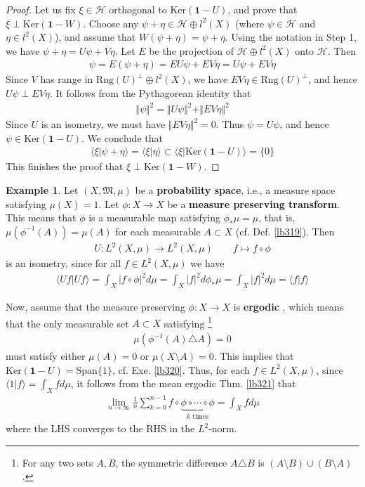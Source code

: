 \documentclass[12pt,b5paper,notitlepage]{article}
\theoremstyle{definition}
\newtheorem{eg}[df]{Example}
\theoremstyle{plain}
\newcommand{\fk}{\mathfrak}
\newcommand{\idt}{\mathbf{1}}
\newcommand{\Span}{\mathrm{Span}}
\newcommand{\bk}[1]{\langle {#1}\rangle}
\newcommand{\Ker}{\mathrm{Ker}}
\newcommand{\Rng}{\mathrm{Rng}}
\newcommand{\MH}{\mathcal H}
\newcommand{\hqed}{\hfill\qedsymbol}
\numberwithin{equation}{section}
\begin{document}
\begin{proof}
Let us fix $\xi\in\MH$ orthogonal to $\Ker(\idt-U)$, and prove that $\xi\perp\Ker(\idt-W)$. Choose any $\psi+\eta\in \MH\oplus l^2(X)$ (where $\psi\in\MH$ and $\eta\in l^2(X)$), and assume that $W(\psi+\eta)=\psi+\eta$. Using the notation in Step 1, we have $\psi+\eta=U\psi+V\eta$. Let $E$ be the projection of $\MH\oplus l^2(X)$ onto $\MH$. Then
\begin{align*}
\psi=E(\psi+\eta)=EU\psi+EV\eta=U\psi+EV\eta
\end{align*}
Since $V$ has range in $\Rng(U)^\perp\oplus l^2(X)$, we have $EV\eta\in\Rng(U)^\perp$, and hence $U\psi\perp EV\eta$. It follows from the Pythagorean identity that
\begin{align*}
\Vert\psi\Vert^2=\Vert U\psi\Vert^2+\Vert EV\eta\Vert^2
\end{align*}
Since $U$ is an isometry, we must have $\Vert EV\eta\Vert^2=0$. Thus $\psi=U\psi$, and hence $\psi\in\Ker(\idt-U)$. We conclude that
\begin{align*}
\bk{\xi|\psi+\eta}=\bk{\xi|\eta}\subset\bk{\xi|\Ker(\idt-U)}=\{0\}
\end{align*}
This finishes the proof that $\xi\perp\Ker(\idt-W)$.
\end{proof}




\begin{eg}
Let $(X,\fk M,\mu)$ be a \textbf{probability space},  i.e., a measure space satisfying $\mu(X)=1$. Let $\phi:X\rightarrow X$ be a \textbf{measure preserving transform}.  This means that $\phi$ is a measurable map satisfying $\phi_*\mu=\mu$, that is, $\mu(\phi^{-1}(A))=\mu(A)$ for each measurable $A\subset X$ (cf. Def. \ref{lb319}). Then
\begin{align}\label{eq170}
U:L^2(X,\mu)\rightarrow L^2(X,\mu)\qquad f\mapsto f\circ\phi
\end{align}
is an isometry, since for all $f\in L^2(X,\mu)$ we have
\begin{align*}
\bk{Uf|Uf}=\int_X |f\circ\phi|^2 d\mu=\int_X|f|^2d\phi_*\mu=\int_X|f|^2d\mu=\bk{f|f}
\end{align*}

Now, assume that the measure preserving $\phi:X\rightarrow X$ is \textbf{ergodic} , which means that the only measurable set $A\subset X$ satisfying \footnote{For any two sets $A,B$, the symmetric difference $A\triangle B$ is $(A\setminus B)\cup (B\setminus A)$.}
\begin{align*}
\mu(\phi^{-1}(A)\triangle A)=0
\end{align*}
must satisfy either $\mu(A)=0$ or $\mu(X\setminus A)=0$. This implies that $\Ker(\idt-U)=\Span\{1\}$, cf. Exe. \ref{lb320}. Thus, for each $f\in L^2(X,\mu)$, since $\bk{1|f}=\int_Xfd\mu$, it follows from the mean ergodic Thm. \ref{lb321} that
\begin{align*}
\lim_{n\rightarrow\infty}\frac {1}{n}\sum_{k=0}^{n-1}f\circ\underbrace{\phi\circ\cdots\circ\phi}_{k\text{ times}}=\int_Xfd\mu
\end{align*}
where the LHS converges to the RHS in the $L^2$-norm.  \hqed
\end{eg}
\end{document}

